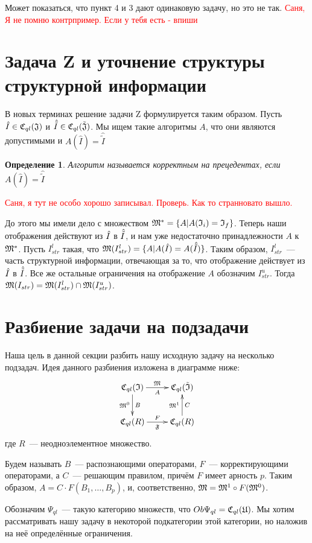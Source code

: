 \documentclass[a4paper, 12pt]{report}
\newtheorem{definition}{Определение}[chapter]
\begin{document}
Может показаться, что пункт 4 и 3 дают одинаковую задачу, но это не так. \textcolor{red}{Саня, Я не помню контрпример. Если у тебя есть - впиши}

\section{Задача Z и уточнение структуры структурной информации}
В новых терминах решение задачи Z формулируется таким образом. Пусть $\hat{I} \in \mathfrak{C}_{ql}(\mathfrak{J})$ и $\hat{\tilde{I}} \in \mathfrak{C}_{ql}(\tilde{\mathfrak{J}})$. Мы ищем такие алгоритмы $A$, что они являются допустимыми и $A(\hat{I}) = \hat{\tilde{I}}$

\begin{definition}
Алгоритм называется корректным на прецедентах, если $A(\hat{I}) = \hat{\tilde{I}}$
\end{definition}
\textcolor{red}{Саня, я тут не особо хорошо записывал. Проверь. Как то странновато вышло.}

До этого мы имели дело с множеством $\mathfrak{M}^* = \{A| A(\mathfrak{I}_i) = \mathfrak{I}_f\}$. Теперь наши отображения действуют из $\hat{I}$ в $\hat{\tilde{I}}$, и нам уже недостаточно принадлежности $A$ к $\mathfrak{M}^*$. Пусть $I_{str}^l$ такая, что $\mathfrak{M}(I_{str}^l) = \{A| A(\hat{I}) = A(\hat{\tilde{I}})\}$. Таким образом, $I_{str}^l$~--- часть структурной информации, отвечающая за то, что отображение действует из $\hat{I}$ в $\hat{\tilde{I}}$. Все же остальные ограничения на отображение $A$ обозначим $I_{str}^u$. Тогда $\mathfrak{M}(I_{str}) = \mathfrak{M}(I_{str}^l)\cap\mathfrak{M}(I_{str}^u)$.

\section{Разбиение задачи на подзадачи}
Наша цель в данной секции разбить нашу исходную задачу на несколько подзадач. Идея данного разбиения изложена в диаграмме ниже:
\begin{equation*}
\xymatrix{
\Cql(\frakI)\ar[r]_A^\frakM\ar[d]_{\frakM^0}^B & \Cql(\tilde{\frakI})\\
\Cql(R)\ar[r]_{\mathfrak{F}}^F & \Cql(R)\ar[u]_C^{\frakM^1}
}
\end{equation*}
где $R$~--- неодноэлементное множество.

Будем называть $B$~--- распознающими операторами, $F$~--- корректирующими операторами, а $C$~--- решающим правилом, причём $F$ имеет арность $p$. Таким образом, $A = C\cdot F(B_1,\ldots, B_p)$, и, соответственно, $\mathfrak{M} = \mathfrak{M}^1\circ F(\mathfrak{M}^0)$.

Обозначим $\Psi_{ql}$~--- такую категорию множеств, что $Ob\Psi_{ql} = \mathfrak{C}_{ql}(\mathfrak{U})$. Мы хотим рассматривать нашу задачу в некоторой подкатегории этой категории, но наложив на неё определённые ограничения.
\end{document}
